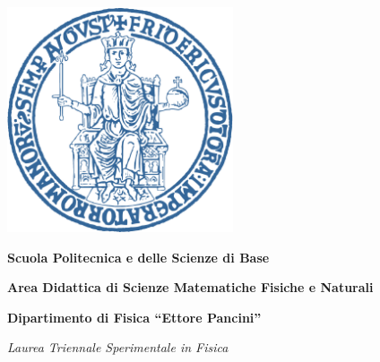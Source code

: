 \begin{titlepage}
    \begin{addmargin}[-1cm]{-3cm}

    \begin{center}
        {\Large {\textbf \myUni}}
    \end{center} 

    \begin{center}
    \includegraphics[width=0.5\textwidth]{gfx/logo-federico-II-blu}
    \end{center}

        \begin{center}
            \textbf{Scuola Politecnica e delle Scienze di Base}
        \end{center}
        \begin{center}
            \textbf{Area Didattica di Scienze Matematiche Fisiche e Naturali}
        \end{center}
        \vspace{5pt}
        \begin{center}
            \textbf{Dipartimento di Fisica \textquotedblleft Ettore Pancini\textquotedblright}
        \end{center}
        \vspace{15pt}
        \begin{center}
            {{ \textit{Laurea Triennale Sperimentale in Fisica}}}
        \end{center}
        \vspace{40pt}

        \begin{center}
            \begingroup
            {\Large\spacedallcaps{\textbf{\myTitle}}}
            \endgroup
        \end{center}
        

\end{addmargin}
\end{titlepage}
